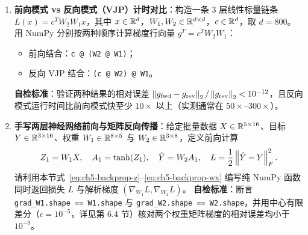 \begin{enumerate}[label=\textbf{5.\arabic*}, resume]
  \item \textbf{前向模式 vs 反向模式（VJP）计时对比}：构造一条 3 层线性标量链条 $L(x) = c^T W_2 W_1 x$，其中 $x\in\mathbb{R}^d$，$W_1, W_2 \in \mathbb{R}^{d\times d}$，$c\in\mathbb{R}^d$，取 $d = 800$。用 NumPy 分别按两种顺序计算梯度行向量 $g^T = c^T W_2 W_1$：
  \begin{itemize}
    \item 前向结合：\texttt{c @ (W2 @ W1)}；
    \item 反向 VJP 结合：\texttt{(c @ W2) @ W1}。
  \end{itemize}
  \textbf{自检标准}：验证两种结果的相对误差 $\left\|g_{\text{fwd}} - g_{\text{rev}}\right\|_2 / \left\|g_{\text{rev}}\right\|_2 < 10^{-12}$，且反向模式运行时间比前向模式快至少 $10\times$ 以上（实测通常在 $50\times$--$300\times$）。

  \item \textbf{手写两层神经网络前向与矩阵反向传播}：给定批量数据 $X\in\mathbb{R}^{5\times 16}$、目标 $Y\in\mathbb{R}^{3\times 16}$、权重 $W_1\in\mathbb{R}^{8\times 5}$ 与 $W_2\in\mathbb{R}^{3\times 8}$，定义前向计算
  \[
    Z_1 = W_1 X,\quad A_1 = \tanh(Z_1),\quad \hat{Y} = W_2 A_1,\quad L = \frac{1}{2}\left\|\hat{Y} - Y\right\|_F^2.
  \]
  请利用本节式~\eqref{eq:ch5-backprop-z}--\eqref{eq:ch5-backprop-wx} 编写纯 NumPy 函数同时返回损失 $L$ 与解析梯度 $(\nabla_{W_1} L, \nabla_{W_2} L)$。
  \textbf{自检标准}：断言 \texttt{grad\_W1.shape == W1.shape} 与 \texttt{grad\_W2.shape == W2.shape}，并用中心有限差分（$\epsilon = 10^{-5}$，详见第 6.4 节）核对两个权重矩阵梯度的相对误差均小于 $10^{-9}$。
\end{enumerate}
